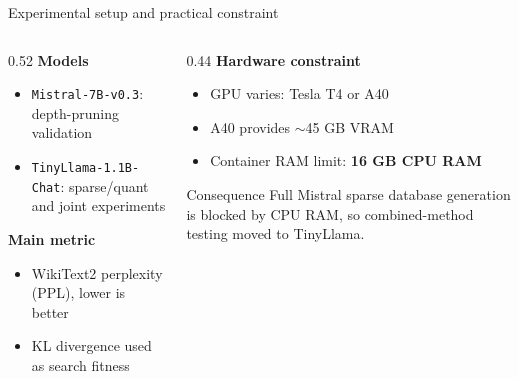 \documentclass[aspectratio=169]{beamer}
\newcommand{\bad}[1]{\textcolor{tuwred}{\textbf{#1}}}
\begin{document}
\begin{frame}{Experimental setup and practical constraint}
\begin{columns}[T]
\begin{column}{0.52\textwidth}
\textbf{Models}
\begin{itemize}
    \item \texttt{Mistral-7B-v0.3}: depth-pruning validation
    \item \texttt{TinyLlama-1.1B-Chat}: sparse/quant and joint experiments
\end{itemize}

\vspace{0.2cm}
\textbf{Main metric}
\begin{itemize}
    \item WikiText2 perplexity (PPL), lower is better
    \item KL divergence used as search fitness
\end{itemize}
\end{column}

\begin{column}{0.44\textwidth}
\textbf{Hardware constraint}
\begin{itemize}
    \item GPU varies: Tesla T4 or A40
    \item A40 provides $\sim$45 GB VRAM
    \item Container RAM limit: \bad{16 GB CPU RAM}
\end{itemize}

\vspace{0.2cm}
\begin{block}{Consequence}
Full Mistral sparse database generation is blocked by CPU RAM, so combined-method testing moved to TinyLlama.
\end{block}
\end{column}
\end{columns}
\end{frame}


\end{document}
